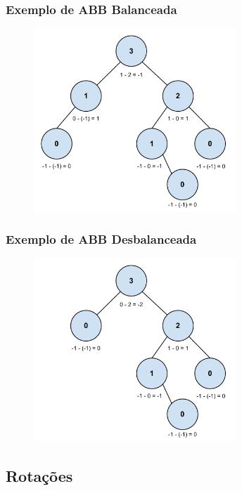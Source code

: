 \begin{frame}
    \frametitle{Exemplo de ABB Balanceada}
    
    \begin{figure}[tbp]
    \includegraphics[keepaspectratio=true,width=3in]{figs/fig_arvores/Balanceamento_Arvore}
    \centering
    \end{figure}
\end{frame}

\begin{frame}
    \frametitle{Exemplo de ABB Desbalanceada}
    
    \begin{figure}[tbp]
    \includegraphics[keepaspectratio=true,width=3in]{figs/fig_arvores/Arvore_Desbalanceada}
    \centering
    \end{figure}
\end{frame}

\subsection{Rotações}

